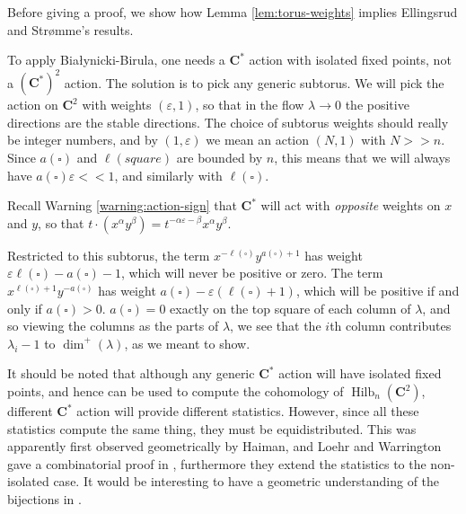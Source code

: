 \documentclass{amsart}[12pt]
\theoremstyle{definition}
\newcommand{\C}{\mathbf{C}}
\DeclareMathOperator{\Hilb}{Hilb}
\begin{document}
Before giving a proof, we show how Lemma \ref{lem:torus-weights} implies Ellingsrud and Str\o mme's results. 

To apply Bia\l ynicki-Birula, one needs a $\C^*$ action with isolated fixed points, not a $(\C^*)^2$ action.  The solution is to pick any generic subtorus.  We will pick the action on $\C^2$ with weights $(\varepsilon,1)$, so that in the flow $\lambda\to 0$ the positive directions are the stable directions.  The choice of subtorus weights should really be integer numbers, and by $(1,\varepsilon)$ we mean an action $(N,1)$ with $N>>n$. Since $a(\square)$ and $\ell(square)$ are bounded by $n$, this means that we will always have $a(\square)\varepsilon<<1$, and similarly with $\ell(\square)$.

Recall Warning \ref{warning:action-sign} that $\C^*$ will act with \emph{opposite} weights on $x$ and $y$, so that $t\cdot(x^\alpha y^\beta)=t^{-\alpha\varepsilon-\beta}x^\alpha y^\beta$.  

Restricted to this subtorus, the term $x^{-\ell(\square)} y^{a(\square)+1}$ has weight $\varepsilon\ell(\square)-a(\square)-1$, which will never be positive or zero.  The term $x^{\ell(\square)+1}y^{-a(\square)}$ has weight $a(\square)-\varepsilon(\ell(\square)+1)$, which will be positive if and only if $a(\square)>0$.  $a(\square)=0$ exactly on the top square of each column of $\lambda$, and so viewing the columns as the parts of $\lambda$, we see that the $i$th column contributes $\lambda_i-1$ to $\dim^+(\lambda)$, as we meant to show.



\begin{center}
\end{center}



It should be noted that although any generic $\C^*$ action will have isolated fixed points, and hence can be used to compute the cohomology of $\Hilb_n(\C^2)$, different $\C^*$ action will provide different statistics.  However, since all these statistics compute the same thing, they must be equidistributed.  This was apparently first observed geometrically by Haiman, and Loehr and Warrington gave a combinatorial proof in \cite{LW}, furthermore they extend the statistics to the non-isolated case.  It would be interesting to have a geometric understanding of the bijections in \cite{LW}.
\end{document}
